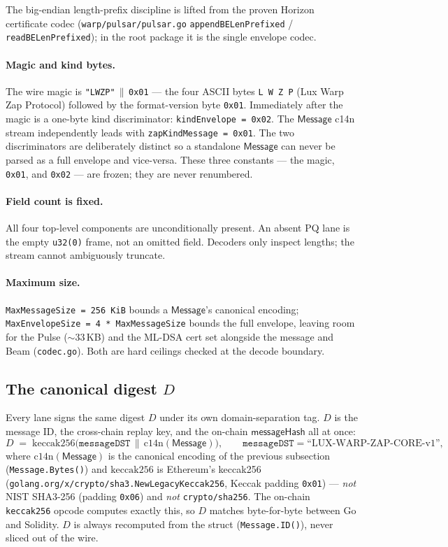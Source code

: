 The big-endian length-prefix discipline is lifted from the proven Horizon certificate codec (\texttt{warp/pulsar/pulsar.go} \texttt{appendBELenPrefixed} / \texttt{readBELenPrefixed}); in the root package it is the single envelope codec.

\paragraph{Magic and kind bytes.} The wire magic is \texttt{"LWZP"}$\,\|\,$\texttt{0x01} --- the four ASCII bytes \texttt{L W Z P} (Lux Warp Zap Protocol) followed by the format-version byte \texttt{0x01}. Immediately after the magic is a one-byte kind discriminator: \texttt{kindEnvelope = 0x02}. The $\mathsf{Message}$ c14n stream independently leads with \texttt{zapKindMessage = 0x01}. The two discriminators are deliberately distinct so a standalone $\mathsf{Message}$ can never be parsed as a full envelope and vice-versa. These three constants --- the magic, \texttt{0x01}, and \texttt{0x02} --- are frozen; they are never renumbered.

\paragraph{Field count is fixed.} All four top-level components are unconditionally present. An absent PQ lane is the empty \texttt{u32(0)} frame, not an omitted field. Decoders only inspect lengths; the stream cannot ambiguously truncate.

\paragraph{Maximum size.} \texttt{MaxMessageSize = 256\,KiB} bounds a $\mathsf{Message}$'s canonical encoding; \texttt{MaxEnvelopeSize = 4 * MaxMessageSize} bounds the full envelope, leaving room for the Pulse ($\sim 33$\,KB) and the ML-DSA cert set alongside the message and Beam (\texttt{codec.go}). Both are hard ceilings checked at the decode boundary.

\subsection{The canonical digest \texorpdfstring{$D$}{D}}

Every lane signs the same digest $D$ under its own domain-separation tag. $D$ is the message ID, the cross-chain replay key, and the on-chain $\mathsf{messageHash}$ all at once:
\[
  D \;=\; \mathrm{keccak256}\big(\texttt{messageDST} \,\|\, \mathrm{c14n}(\mathsf{Message})\big),
  \qquad \texttt{messageDST} = \text{``LUX-WARP-ZAP-CORE-v1''},
\]
where $\mathrm{c14n}(\mathsf{Message})$ is the canonical encoding of the previous subsection (\texttt{Message.Bytes()}) and $\mathrm{keccak256}$ is Ethereum's keccak256 (\texttt{golang.org/x/crypto/sha3.NewLegacyKeccak256}, Keccak padding \texttt{0x01}) --- \emph{not} NIST SHA3-256 (padding \texttt{0x06}) and \emph{not} \texttt{crypto/sha256}. The on-chain \texttt{keccak256} opcode computes exactly this, so $D$ matches byte-for-byte between Go and Solidity. $D$ is always recomputed from the struct (\texttt{Message.ID()}), never sliced out of the wire.

